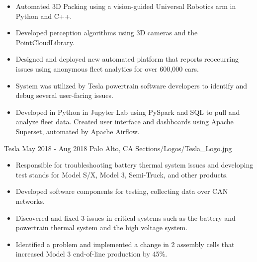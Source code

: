 {}
    \begin{itemize}
        \item Automated 3D Packing using a vision-guided Universal Robotics arm in Python and C++.
        \item Developed perception algorithms using 3D cameras and the PointCloudLibrary.
    \end{itemize}
\divider
{}
    \begin{itemize}
        \item Designed and deployed new automated platform that reports reoccurring issues using anonymous fleet analytics for over 600,000 cars.
        \item System was utilized by Tesla powertrain software developers to identify and debug several user-facing issues.
        \item Developed in Python in Jupyter Lab using PySpark and SQL to pull and analyze fleet data. Created user interface and dashboards using Apache Superset, automated by Apache Airflow.
    \end{itemize}
{}
    {Tesla}
    {May 2018 - Aug 2018}
    {Palo Alto, CA}
    {Sections/Logos/Tesla_Logo.jpg}
    \begin{itemize}
        \item Responsible for troubleshooting battery thermal system issues and developing test stands for Model S/X, Model 3, Semi-Truck, and other products.
        \item Developed software components for testing, collecting data over CAN networks.
        \item Discovered and fixed 3 issues in critical systems such as the battery and powertrain thermal system and the high voltage system.
        \item Identified a problem and implemented a change in 2 assembly cells that increased Model 3 end-of-line production by 45\%.
    \end{itemize}

